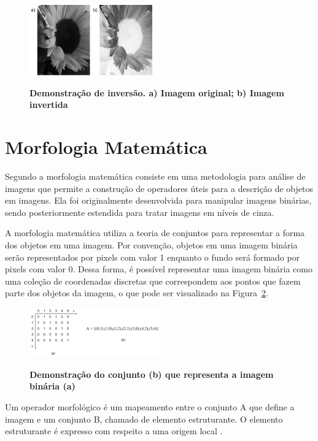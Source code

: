 \documentclass[12pt,oneside,a4paper,english,french,spanish,brazil,]{abntex2}
\begin{document}
\begin{figure}[ht]
\centering
\caption{\textbf{Demonstração de inversão. a) Imagem original; b) Imagem invertida}}
\includegraphics[width=0.5\textwidth]{imagens/PDI_Inversao.pdf}
\sourceAuthor
\label{fig:PDI_Inversao}
\end{figure}

\section{Morfologia Matemática}

Segundo \citet{pedrini:2008} a morfologia matemática consiste em uma metodologia para análise de imagens que permite a construção de operadores úteis para a descrição de objetos em imagens. Ela foi originalmente desenvolvida para manipular imagens binárias, sendo posteriormente estendida para tratar imagens em níveis de cinza.

A morfologia matemática utiliza a teoria de conjuntos para representar a forma dos objetos em uma imagem. Por convenção, objetos em uma imagem binária serão representados por pixels com valor 1 enquanto o fundo será formado por pixels com valor 0. Dessa forma, é possível representar uma imagem binária como uma coleção de coordenadas discretas que correspondem aos pontos que fazem parte dos objetos da imagem, o que pode ser visualizado na Figura~\ref{fig:PDI_Conjunto}.

\begin{figure}[ht]
\centering
\caption{\textbf{Demonstração do conjunto (b) que representa a imagem binária (a)}}
\includegraphics[width=0.5\textwidth]{imagens/PDI_Conjunto.pdf}
\label{fig:PDI_Conjunto}
\end{figure}

Um operador morfológico é um mapeamento entre o conjunto A que define a imagem e um conjunto B, chamado de elemento estruturante. O elemento estruturante é expresso com respeito a uma origem local \cite{pedrini:2008}.
\end{document}
